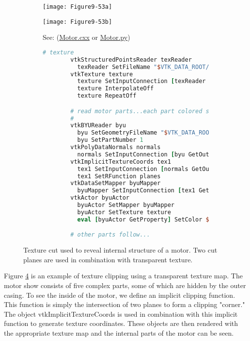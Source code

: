 \begin{figure}[htb]
    \centering
	\begin{subfigure}[h]{0.48\linewidth}
		\texttt{[image: Figure9-53a]}
		\captionsetup{justification=centering}
		\caption*{}
		\label{fig:Figure9-53a}
	\end{subfigure}
	\hfill
	\begin{subfigure}[h]{0.48\linewidth}
		\texttt{[image: Figure9-53b]}
		\captionsetup{justification=centering}
		\caption*{See: (\href{https://lorensen.github.io/VTKExamples/site/Cxx/VisualizationAlgorithms/Motor/}{Motor.cxx} or \href{https://lorensen.github.io/VTKExamples/site/Python/VisualizationAlgorithms/Motor/}{Motor.py})}
        \label{fig:Figure9-53b}
	\end{subfigure}
	\hfill
	\begin{subfigure}[h]{0.96\linewidth}
        \begin{lstlisting}[language=TCL,  caption={}, numbers=none, frame=none]
        # texture
        vtkStructuredPointsReader texReader
          texReader SetFileName "$VTK_DATA_ROOT/Data/texThres2.vtk"
        vtkTexture texture
          texture SetInputConnection [texReader GetOutputPort]
          texture InterpolateOff
          texture RepeatOff

        # read motor parts...each part colored separately
        #
        vtkBYUReader byu
          byu SetGeometryFileName "$VTK_DATA_ROOT/Data/motor.g"
          byu SetPartNumber 1
        vtkPolyDataNormals normals
          normals SetInputConnection [byu GetOutputPort]
        vtkImplicitTextureCoords tex1
          tex1 SetInputConnection [normals GetOutputPort]
          tex1 SetRFunction planes
        vtkDataSetMapper byuMapper
          byuMapper SetInputConnection [tex1 GetOutputPort]
        vtkActor byuActor
          byuActor SetMapper byuMapper
          byuActor SetTexture texture
          eval [byuActor GetProperty] SetColor $cold_grey

        # other parts follow...
        \end{lstlisting}
        \label{fig:Figure9-53d}
	\end{subfigure}
	\caption{Texture cut used to reveal internal structure of a motor. Two cut planes are used in combination with transparent texture.}\label{fig:Figure9-53}
\end{figure}

Figure \ref{fig:Figure9-53} is an example of texture clipping using a transparent texture map. The motor show consists of five complex parts, some of which are hidden by the outer casing. To see the inside of the motor, we define an implicit clipping function. This function is simply the intersection of two planes to form a clipping "corner." The object vtkImplicitTextureCoords is used in combination with this implicit function to generate texture coordinates. These objects are then rendered with the appropriate texture map and the internal parts of the motor can be seen.

